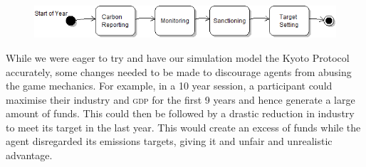 \begin{figure}[h!]
	\centering
	\includegraphics[width=\textwidth]{img/Kyoto_4_states.png}
	\caption{}
	\label{fig:kyoto_4_states}
\end{figure}

While we were eager to try and have our simulation model the Kyoto Protocol accurately, some changes needed to be made to discourage agents from abusing the game mechanics. For example, in a 10 year session, a participant could maximise their industry and \textsc{gdp} for the first 9 years and hence generate a large amount of funds. This could then be followed by a drastic reduction in industry to meet its target in the last year. This would create an excess of funds while the agent disregarded its emissions targets, giving it and unfair and unrealistic advantage.

